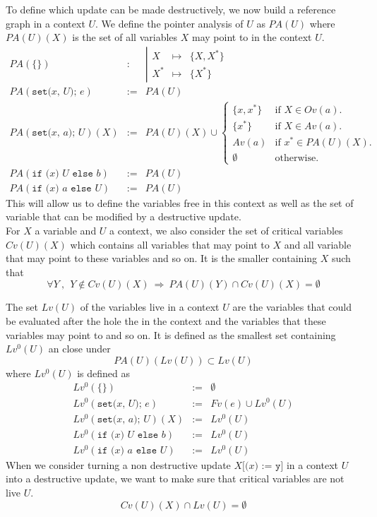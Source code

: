 \documentclass[12pt,a4paper]{article}
\newcommand{\cl}[1]{\texttt{#1}}
\newcommand{\ucont}[1]{\{#1\}}
\begin{document}
To define which update can be made destructively, we now build a reference graph in a context $U$. We define the pointer analysis of $U$ as $PA(U)$ where $PA(U)(X)$ is the set of all variables $X$ may point to in the context $U$.
\begin{eqnarray*}
PA(\ucont{} ) &:& \left| \begin{array}{lcl}
X   & \mapsto & \{ X, X^* \} \\
X^* & \mapsto & \{ X^* \}
\end{array}  \right. \\
PA( \cl{set(} x \cl{, } U \cl{); } e ) &:=& PA(U) \\
PA( \cl{set(} x \cl{, } a \cl{); } U )(X) &:=& PA(U)(X) \cup \left\lbrace \begin{array}{ll}
\{ x, x^* \} & \text{if $X \in Ov(a)$.} \\
\{ x^* \} & \text{if $X \in Av(a)$.} \\
Av(a) & \text{if $x^* \in PA(U)(X)$.} \\
\emptyset & \text{otherwise.}
\end{array} \right. \\
PA( \cl{if (} x \cl{) } U \cl{ else } b ) &:=& PA(U) \\
PA( \cl{if (} x \cl{) } a \cl{ else } U ) &:=& PA(U) 
\end{eqnarray*}
This will allow us to define the variables free in this context as well as the set of variable that can be modified by a destructive update. \\



For $X$ a variable and $U$ a context, we also consider the set of critical variables $Cv(U)(X)$ which contains all variables that may point to $X$ and all variable that may point to these variables and so on. It is the smaller containing $X$ such that
$$\forall Y \ , \ \ Y \notin Cv(U)(X) \ \Longrightarrow \ PA(U)(Y) \cap Cv(U)(X) = \emptyset $$


The set $Lv(U)$ of the variables live in a context $U$ are the variables that could be evaluated after the hole the in the context and the variables that these variables may point to and so on. It is defined as the smallest set containing $Lv^0(U)$ an close under 
$$ PA(U)(Lv(U)) \subset Lv(U) $$
where $Lv^0(U)$ is defined as
\begin{eqnarray*}
Lv^0(\ucont{} ) &:=& \emptyset \\
Lv^0( \cl{set(} x \cl{, } U \cl{); } e ) &:=& Fv(e) \cup Lv^0(U) \\
Lv^0( \cl{set(} x \cl{, } a \cl{); } U )(X) &:=& Lv^0(U) \\
Lv^0( \cl{if (} x \cl{) } U \cl{ else } b ) &:=& Lv^0(U) \\
Lv^0( \cl{if (} x \cl{) } a \cl{ else } U ) &:=& Lv^0(U)
\end{eqnarray*}
When we consider turning a non destructive update $X\cl{[(}x\cl{) := } \cl{y} \cl{]}$ in a context $U$ into a destructive update, we want to make sure that critical variables are not live $U$.
$$ Cv(U)(X) \cap Lv(U) = \emptyset $$
\end{document}
